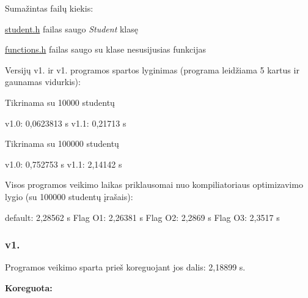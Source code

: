 \begin{DoxyItemize}
\item Sumažintas failų kiekis\+:
\begin{DoxyItemize}
\item {\ttfamily \hyperlink{student_8h}{student.\+h}} failas saugo {\itshape Student} klasę
\item {\ttfamily \hyperlink{functions_8h}{functions.\+h}} failas saugo su klase nesusijusias funkcijas
\end{DoxyItemize}
\item Versijų v1. ir v1. programos spartos lyginimas (programa leidžiama 5 kartus ir gaunamas vidurkis)\+: 
\begin{DoxyCode}
Tikrinama su 10000 studentų

v1.0: 0,0623813 s
v1.1: 0,21713 s
\end{DoxyCode}
 
\begin{DoxyCode}
Tikrinama su 100000 studentų

v1.0: 0,752753 s
v1.1: 2,14142 s
\end{DoxyCode}

\item Visos programos veikimo laikas priklausomai nuo kompiliatoriaus optimizavimo lygio (su 100000 studentų įrašais)\+: 
\begin{DoxyCode}
default: 2,28562 s
Flag O1: 2,26381 s
Flag O2: 2,2869 s
Flag O3: 2,3517 s
\end{DoxyCode}

\end{DoxyItemize}

\subsubsection*{v1.}


\begin{DoxyItemize}
\item Programos veikimo sparta prieš koreguojant jos dalis\+: 2,18899 s.
\end{DoxyItemize}

{\bfseries Koreguota\+:}


